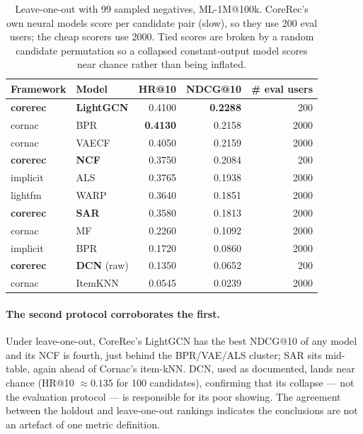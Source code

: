 \documentclass[10pt]{article}
\begin{document}
\begin{table}[h]\centering\small
\begin{tabular}{llrrr}
\toprule
Framework & Model & HR@10 & NDCG@10 & \# eval users \\
\midrule
\textbf{corerec} & \textbf{LightGCN} & 0.4100 & \textbf{0.2288} & 200 \\
cornac   & BPR      & \textbf{0.4130} & 0.2158 & 2000 \\
cornac   & VAECF    & 0.4050 & 0.2159 & 2000 \\
\textbf{corerec} & \textbf{NCF} & 0.3750 & 0.2084 & 200 \\
implicit & ALS      & 0.3765 & 0.1938 & 2000 \\
lightfm  & WARP     & 0.3640 & 0.1851 & 2000 \\
\textbf{corerec} & \textbf{SAR} & 0.3580 & 0.1813 & 2000 \\
cornac   & MF       & 0.2260 & 0.1092 & 2000 \\
implicit & BPR      & 0.1720 & 0.0860 & 2000 \\
\textbf{corerec} & \textbf{DCN} (raw) & 0.1350 & 0.0652 & 200 \\
cornac   & ItemKNN  & 0.0545 & 0.0239 & 2000 \\
\bottomrule
\end{tabular}
\caption{Leave-one-out with 99 sampled negatives, ML-1M@100k. CoreRec's own
neural models score per candidate pair (slow), so they use 200 eval users; the
cheap scorers use 2000. Tied scores are broken by a random candidate permutation
so a collapsed constant-output model scores near chance rather than being
inflated.}
\label{tab:loo}
\end{table}

\paragraph{The second protocol corroborates the first.} Under leave-one-out,
CoreRec's LightGCN has the best NDCG@10 of any model and its NCF is fourth, just
behind the BPR/VAE/ALS cluster; SAR sits mid-table, again ahead of Cornac's
item-kNN. DCN, used as documented, lands near chance (HR@10 $\approx 0.135$ for
100 candidates), confirming that its collapse --- not the evaluation protocol ---
is responsible for its poor showing. The agreement between the holdout and
leave-one-out rankings indicates the conclusions are not an artefact of one
metric definition.

\end{document}
